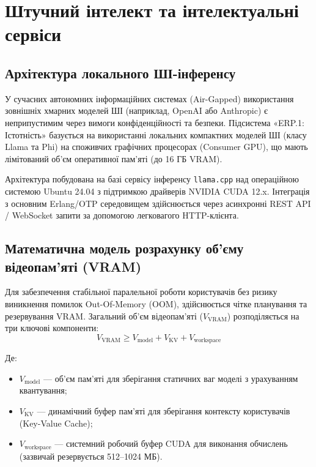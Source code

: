 \chapter{Штучний інтелект та інтелектуальні сервіси}

\section{Архітектура локального ШІ-інференсу}
У сучасних автономних інформаційних системах (Air-Gapped) використання зовнішніх хмарних моделей ШІ (наприклад, OpenAI або Anthropic) є неприпустимим через вимоги конфіденційності та безпеки. Підсистема «ERP.1: Істотність» базується на використанні локальних компактних моделей ШІ (класу Llama та Phi) на споживчих графічних процесорах (Consumer GPU), що мають лімітований об'єм оперативної пам'яті (до 16 ГБ VRAM).

Архітектура побудована на базі сервісу інференсу \texttt{llama.cpp} над операційною системою Ubuntu 24.04 з підтримкою драйверів NVIDIA CUDA 12.x. Інтеграція з основним Erlang/OTP середовищем здійснюється через асинхронні REST API / WebSocket запити за допомогою легковагого HTTP-клієнта.

\section{Математична модель розрахунку об'єму відеопам'яті (VRAM)}
Для забезпечення стабільної паралельної роботи користувачів без ризику виникнення помилок Out-Of-Memory (OOM), здійснюється чітке планування та резервування VRAM. Загальний об'єм відеопам'яті ($V_{\text{VRAM}}$) розподіляється на три ключові компоненти:
\begin{equation}
    V_{\text{VRAM}} \ge V_{\text{model}} + V_{\text{KV}} + V_{\text{workspace}}
\end{equation}

Де:
\begin{itemize}
    \item $V_{\text{model}}$ --- об'єм пам'яті для зберігання статичних ваг моделі з урахуванням квантування;
    \item $V_{\text{KV}}$ --- динамічний буфер пам'яті для зберігання контексту користувачів (Key-Value Cache);
    \item $V_{\text{workspace}}$ --- системний робочий буфер CUDA для виконання обчислень (зазвичай резервується 512--1024 МБ).
\end{itemize}

